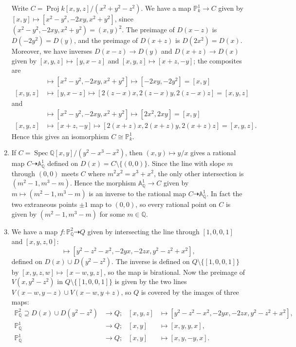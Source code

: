 \documentclass{report}
\newcommand{\A}{\mathbb{A}}
\renewcommand{\P}{\mathbb{P}} %
\newcommand{\Q}{\mathbb{Q}}
\DeclareMathOperator{\Spec}{Spec}
\DeclareMathOperator{\Proj}{Proj}
\begin{document}
\begin{enumerate}[label=\textbf{6.5.\Alph*.}]
	      Write $C=\Proj k[x,y,z]/(x^2+y^2-z^2)$. We have a map $\P^1_k\to C$
	      given by $[x,y]\mapsto[x^2-y^2,-2xy,x^2+y^2]$, since
	      $(x^2-y^2,-2xy,x^2+y^2)=(x,y)^2$. The preimage of $D(x-z)$ is
	      $D(-2y^2)=D(y)$, and the preimage of $D(x+z)$ is $D(2x^2)=D(x)$.
	      Moreover, we have inverses $D(x-z)\to D(y)$ and $D(x+z)\to D(x)$ given
	      by $[x,y,z]\mapsto[y,x-z]$ and $[x,y,z]\mapsto[x+z,-y]$; the
	      composites are
	      \begin{align*}
		      [x,y]   & \mapsto [x^2-y^2,-2xy,x^2+y^2] \mapsto [-2xy,-2y^2] = [x,y] \\
		      [x,y,z] & \mapsto [y,x-z] \mapsto [2(z-x)x,2(z-x)y,2(z-x)z] = [x,y,z]
	      \end{align*}
	      and
	      \begin{align*}
		      [x,y]   & \mapsto [x^2-y^2,-2xy,x^2+y^2] \mapsto [2x^2,2xy] = [x,y]     \\
		      [x,y,z] & \mapsto [x+z,-y] \mapsto [2(x+z)x,2(x+z)y,2(x+z)z] = [x,y,z].
	      \end{align*}
	      Hence this gives an isomorphism $C\cong\P^1_k$.

	\item If $C=\Spec\Q[x,y]/(y^2-x^3-x^2)$, then $(x,y)\mapsto y/x$ gives a
	      rational map $C\dashrightarrow\A^1_\Q$ defined on
	      $D(x)=C\setminus\{(0,0)\}$. Since the line with slope $m$ through
	      $(0,0)$ meets $C$ where $m^2x^2=x^3+x^2$, the only other intersection
	      is $(m^2-1,m^3-m)$. Hence the morphism $\A^1_\Q\to C$ given by
	      $m\mapsto(m^2-1,m^3-m)$ is an inverse to the rational map
	      $C\dashrightarrow\A^1_\Q$. In fact the two extraneous points $\pm1$
	      map to $(0,0)$, so every rational point on $C$ is given by
	      $(m^2-1,m^3-m)$ for some $m\in\Q$.

	\item We have a map $f:\P^2_\Q\dashrightarrow Q$ given by intersecting the
	      line through $[1,0,0,1]$ and $[x,y,z,0]$:
	      \begin{equation*}
		      [x,y,z]\mapsto[y^2-z^2-x^2,-2yx,-2zx,y^2-z^2+x^2],
	      \end{equation*}
	      defined on $D(x)\cup D(y^2-z^2)$. The inverse is defined on
	      $Q\setminus\{[1,0,0,1]\}$ by $[x,y,z,w]\mapsto[x-w,y,z]$, so the
	      map is birational. Now the preimage of $V(x,y^2-z^2)$ in
	      $Q\setminus\{[1,0,0,1]\}$ is given by the two lines
	      $V(x-w,y-z)\cup V(x-w,y+z)$, so $Q$ is covered by the images of three
	      maps:
	      \begin{align*}
		      \P^2_\Q\supseteq D(x)\cup D(y^2-z^2) & \to Q; & [x,y,z] & \mapsto[y^2-z^2-x^2,-2yx,-2zx,y^2-z^2+x^2], \\
		      \P^1_\Q                              & \to Q; & [x,y]   & \mapsto[x,y,y,x],                           \\
		      \P^1_\Q                              & \to Q; & [x,y]   & \mapsto[x,y,-y,x].
	      \end{align*}


\end{enumerate}
\end{document}
